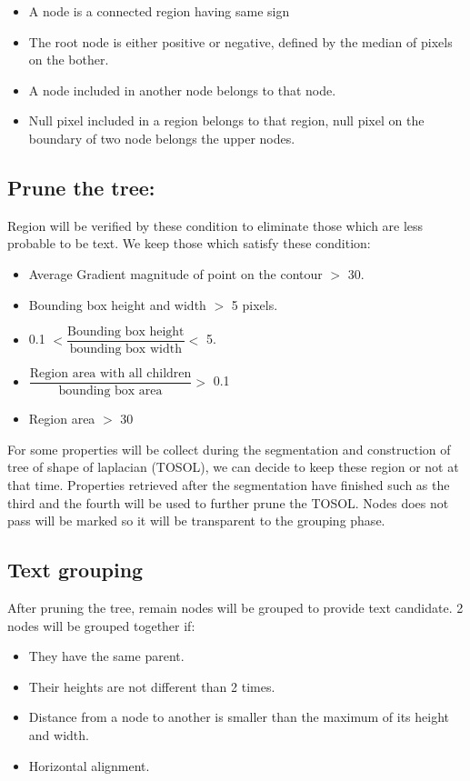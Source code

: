 \documentclass[12pt,a4paper,draft]{article}
\begin{document}
	\begin{itemize}
		\item A node is a connected region having same sign
		\item The root node is either positive or negative, defined by the median of pixels on the bother.
		\item A node included in another node belongs to that node.
		\item Null pixel included in a region belongs to that region, null pixel on the boundary of two node belongs the upper nodes.
	\end{itemize}
	
\subsection{Prune the tree: } 

Region will be verified by these condition to eliminate those which are less probable to be text. We keep those which satisfy these condition: 

\begin{itemize}
\item Average Gradient magnitude of point on the contour $>$ 30.
\item Bounding box height and width $>$ 5 pixels.
\item 0.1 $< \dfrac{\text{Bounding box height}}{\text{bounding box width}} <$ 5.
\item $ \dfrac{\text{Region area with all children}}{\text{bounding box area}} >$ 0.1
\item Region area $>$ 30
\end{itemize}

For some properties will be collect during the segmentation and construction of tree of shape of laplacian (TOSOL), we can decide to keep these region or not at that time. Properties retrieved after the segmentation have finished such as the third and the fourth will be used to further prune the TOSOL. Nodes does not pass will be marked so it will be transparent to the grouping phase.

\subsection{Text grouping}
After pruning the tree, remain nodes will be grouped to provide text candidate. 2 nodes will be grouped together if:
	\begin{itemize}
		\item They have the same parent.
		\item Their heights are not different than 2 times.
		\item Distance from a node to another is smaller than the maximum of its height and width.
		\item Horizontal alignment. 
	\end{itemize}
	
\end{document}
